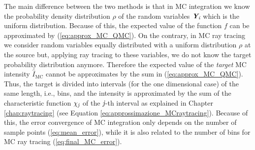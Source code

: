 The main difference between the two methods is that in MC integration we know the probability density distribution $\rho$ of the random variables $\textit{\textbf{Y}}_{\textit{i}}$ which is the uniform distribution. Because of this, the expected value of the function $f$ can be approximated by (\ref{eq:approx_MC_QMC}). On the contrary, in MC ray tracing we consider random variables equally distributed with a uniform distribution $\rho$ at the source but, applying ray tracing to these variables, we do not know the target probability distribution anymore. Therefore the expected value of the \textit{target} MC intensity $\hat{I}_{\textrm{MC}}$ cannot be approximates by the sum in (\ref{eq:approx_MC_QMC}). Thus, the target is divided into intervals (for the one dimensional case) of the same length, i.e., bins, and the intensity is approximated by the sum of the characteristic function $\chi_{\textit{j}}$ of the $\textit{j}$-th interval as explained in Chapter \ref{chap:raytracing} (see Equation \ref{eq:approssimazione_MCraytracing}). Because of this, the error convergence of MC integration only depends on the number of sample points (\ref{eq:mean_error}), while it is also related to the number of bins for MC ray tracing (\ref{eq:final_MC_error}).










